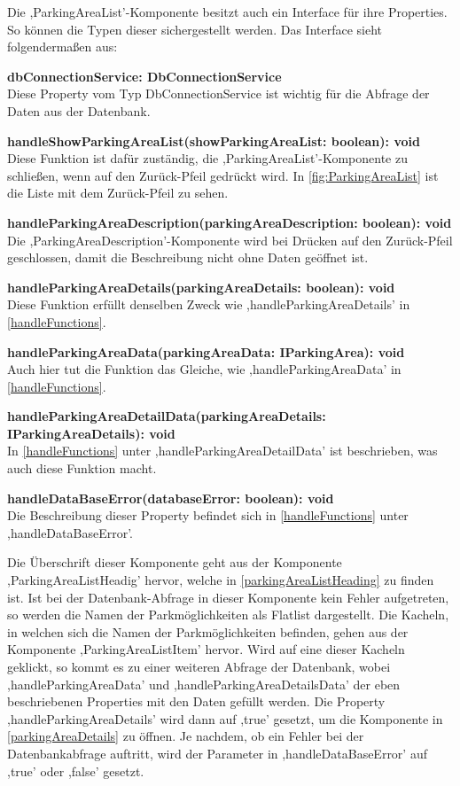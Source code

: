 Die ,ParkingAreaList'-Komponente besitzt auch ein Interface für ihre Properties. So können die Typen dieser sichergestellt werden. Das Interface sieht folgendermaßen aus:
\begin{description}
	\item \textbf{dbConnectionService: DbConnectionService} \\ Diese Property vom Typ DbConnectionService ist wichtig für die Abfrage der Daten aus der Datenbank.
	\item \textbf{handleShowParkingAreaList(showParkingAreaList: boolean): void} \\ Diese Funktion ist dafür zuständig, die ,ParkingAreaList'-Komponente zu schließen, wenn auf den Zurück-Pfeil gedrückt wird. In \autoref{fig:ParkingAreaList} ist die Liste mit dem Zurück-Pfeil zu sehen.
	\item \textbf{handleParkingAreaDescription(parkingAreaDescription: boolean): void} \\ Die ,ParkingAreaDescription'-Komponente wird bei Drücken auf den Zurück-Pfeil geschlossen, damit die Beschreibung nicht ohne Daten geöffnet ist.
	\item \textbf{handleParkingAreaDetails(parkingAreaDetails: boolean): void} \\ Diese Funktion erfüllt denselben Zweck wie ,handleParkingAreaDetails' in \autoref{handleFunctions}.
	\item \textbf{handleParkingAreaData(parkingAreaData: IParkingArea): void} \\ Auch hier tut die Funktion das Gleiche, wie ,handleParkingAreaData' in \autoref{handleFunctions}.
	\item \textbf{handleParkingAreaDetailData(parkingAreaDetails: IParkingAreaDetails): void} \\ In \autoref{handleFunctions} unter ,handleParkingAreaDetailData' ist beschrieben, was auch diese Funktion macht.
	\item \textbf{handleDataBaseError(databaseError: boolean): void} \\ Die Beschreibung dieser Property befindet sich in \autoref{handleFunctions} unter ,handleDataBaseError'.
\end{description} 

Die Überschrift dieser Komponente geht aus der Komponente ,ParkingAreaListHeadig' hervor, welche in \autoref{parkingAreaListHeading} zu finden ist. Ist bei der Datenbank-Abfrage in dieser Komponente kein Fehler aufgetreten, so werden die Namen der Parkmöglichkeiten als Flatlist dargestellt. Die Kacheln, in welchen sich die Namen der Parkmöglichkeiten befinden, gehen aus der Komponente ,ParkingAreaListItem' hervor. Wird auf eine dieser Kacheln geklickt, so kommt es zu einer weiteren Abfrage der Datenbank, wobei ,handleParkingAreaData' und ,handleParkingAreaDetailsData' der eben beschriebenen Properties mit den Daten gefüllt werden. Die Property ,handleParkingAreaDetails' wird dann auf ,true' gesetzt, um die Komponente in \autoref{parkingAreaDetails} zu öffnen. Je nachdem, ob ein Fehler bei der Datenbankabfrage auftritt, wird der Parameter in ,handleDataBaseError' auf ,true' oder ,false' gesetzt.

